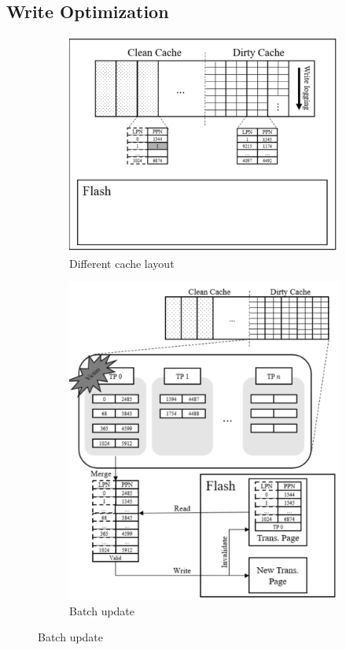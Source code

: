 \documentclass[conference]{IEEEtran}
\begin{document}
\subsection{Write Optimization}
\begin{figure}[hbt]
	\centering
	\begin{subfigure}[b]{0.5\textwidth}	
		\includegraphics[width=\linewidth]{image/PTSD/Dcache.png}
		\caption{Different cache layout} \label{fig:Dcache}
	\end{subfigure}
	\begin{subfigure}[b]{0.4\textwidth}	
		\includegraphics[width=\linewidth]{image/PTSD/batch.png}
		\caption{Batch update} \label{fig:batch}
	\end{subfigure}
\end{figure}
\end{document}
